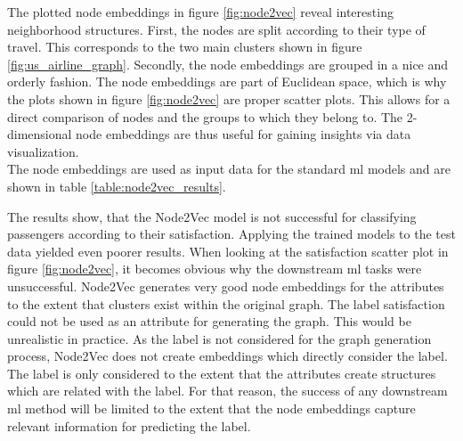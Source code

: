   \noindent The plotted node embeddings in figure \ref{fig:node2vec} reveal 
  interesting neighborhood structures. First, the nodes are split according to
  their type of travel. This corresponds to the two main clusters shown in
  figure \ref{fig:us_airline_graph}. Secondly, the node embeddings are grouped 
  in a nice and orderly fashion. The node embeddings are part of Euclidean
  space, which is why the plots shown in figure \ref{fig:node2vec} are proper
  scatter plots. This allows for a direct comparison of nodes and the groups to
  which they belong to. The 2-dimensional node embeddings are thus useful for
  gaining insights via data visualization.\\

  \noindent The node embeddings are used as input data for the standard \acs{ml} 
  models and are shown in table \ref{table:node2vec_results}.

  \begin{table}[h]
    \centering
    \caption{Node2Vec Classification Results}
    \label{table:node2vec_results}
  \end{table}

  \noindent The results show, that the Node2Vec model is not successful for
  classifying passengers according to their satisfaction. Applying the trained
  models to the test data yielded even poorer results. When looking at the
  satisfaction scatter plot in figure \ref{fig:node2vec}, it becomes obvious why
  the downstream \acs{ml} tasks were unsuccessful. Node2Vec generates very good 
  node embeddings for the attributes to the extent that clusters exist within 
  the original graph. The label satisfaction could not be used as an attribute 
  for generating the graph. This would be unrealistic in practice. As the label 
  is not considered for the graph generation process, Node2Vec does not create 
  embeddings which directly consider the label. The label is only considered to 
  the extent that the attributes create structures which are related with the 
  label. For that reason, the success of any downstream \acs{ml} method will be 
  limited to the extent that the node embeddings capture relevant information 
  for predicting the label. \\

